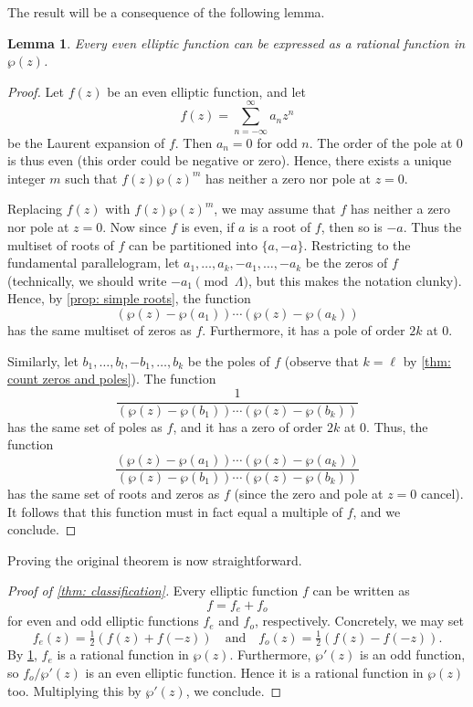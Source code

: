 \documentclass[12pt,reqno]{amsart}
\theoremstyle{plain}
\numberwithin{equation}{section}
\newtheorem{lemma}{Lemma}
\begin{document}
The result will be a consequence of the following lemma.
\begin{lemma}\label{lem: even classification}
    Every \textit{even} elliptic function can be expressed as a rational function in $\wp(z)$.
\end{lemma}
\begin{proof}
Let $f(z)$ be an even elliptic function, and let
\[f(z) = \sum_{n=-\infty}^\infty a_nz^n\]
be the Laurent expansion of $f$. Then $a_n =0$ for odd $n$. The order of the pole at $0$ is thus even (this order could be negative or zero). Hence, there exists a unique integer $m$ such that $f(z)\wp(z)^m$ has neither a zero nor pole at $z=0$. 

Replacing $f(z)$ with $f(z)\wp(z)^m$, we may assume that $f$ has neither a zero nor pole at $z=0$. Now since $f$ is even, if $a$ is a root of $f$, then so is $-a$. Thus the multiset of roots of $f$ can be partitioned into $\{a,-a\}$. Restricting to the fundamental parallelogram, let $a_1,\dots, a_k, -a_1,\dots, -a_k$ be the zeros of $f$ (technically, we should write $-a_1\pmod{\Lambda}$, but this makes the notation clunky). Hence, by \cref{prop: simple roots}, the function
\[(\wp(z) - \wp(a_1)) \cdots (\wp(z) - \wp(a_k))\]
has the same multiset of zeros as $f$. Furthermore, it has a pole of order $2k$ at $0$.

Similarly, let $b_1,\dots, b_l, -b_1,\dots, b_k$ be the poles of $f$ (observe that $k = \ell$ by \cref{thm: count zeros and poles}). The function 
\[\frac{1}{(\wp(z) - \wp(b_1)) \cdots (\wp(z) - \wp(b_k))}\]
has the same set of poles as $f$, and it has a zero of order $2k$ at $0$. Thus, the function
\[\frac{(\wp(z) - \wp(a_1)) \cdots (\wp(z) - \wp(a_k))}{(\wp(z) - \wp(b_1)) \cdots (\wp(z) - \wp(b_k))}\]
has the same set of roots and zeros as $f$ (since the zero and pole at $z=0$ cancel). It follows that this function must in fact equal a multiple of $f$, and we conclude.
\end{proof}
Proving the original theorem is now straightforward.
\begin{proof}[Proof of \cref{thm: classification}]
    Every elliptic function $f$ can be written as
    \[f = f_e +f_o\]
    for even and odd elliptic functions $f_e$ and $f_o$, respectively. Concretely, we may set
    \[f_e(z) = \tfrac{1}{2}(f(z) + f(-z)) \quad \text{and}\quad f_o(z) = \tfrac{1}{2}(f(z) - f(-z)).\]
    By \cref{lem: even classification}, $f_e$ is a rational function in $\wp(z)$. Furthermore, $\wp'(z)$ is an odd function, so $f_o/\wp'(z)$ is an even elliptic function. Hence it is a rational function in $\wp(z)$ too. Multiplying this by $\wp'(z)$, we conclude.
\end{proof}
\end{document}

